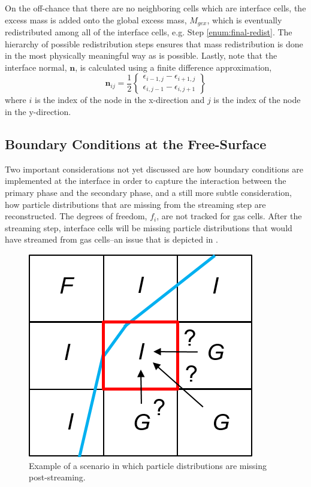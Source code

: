 \documentclass[pdftex,ms]{pittetd}
\begin{document}
On the off-chance that there are no neighboring cells which are interface cells, the excess mass is added onto the global excess mass, $M_{gex}$, which is eventually redistributed among all of the interface cells, e.g. Step \ref{enum:final-redist}.
The hierarchy of possible redistribution steps ensures that mass redistribution is done in the most physically meaningful way as is possible. %
Lastly, note that the interface normal, $\mathbf{n}$, is calculated using a finite difference approximation,
\begin{equation} \label{eq:n}
\mathbf{n}_{ij} = \frac{1}{2} \begin{Bmatrix}
\epsilon_{i-1, j} - \epsilon_{i+1, j} \\
\epsilon_{i, j-1} - \epsilon_{i, j+1}
\end{Bmatrix}
\end{equation}
\noindent where $i$ is the index of the node in the x-direction and $j$ is the index of the node in the y-direction.

\subsection{Boundary Conditions at the Free-Surface} \label{sec:bc-at-fs}

Two important considerations not yet discussed are how boundary conditions are implemented at the interface in order to capture the interaction between the primary phase and the secondary phase, and a still more subtle consideration, how particle distributions that are missing from the streaming step are reconstructed.
The degrees of freedom, $f_i$, are not tracked for gas cells.
After the streaming step, interface cells will be missing particle distributions that would have streamed from gas cells--an issue that is depicted in .

\begin{figure}
\centering
\includegraphics{figs/ps}
\caption{Example of a scenario in which particle distributions are missing post-streaming.}
\label{fig:ps}
\end{figure}
\end{document}
